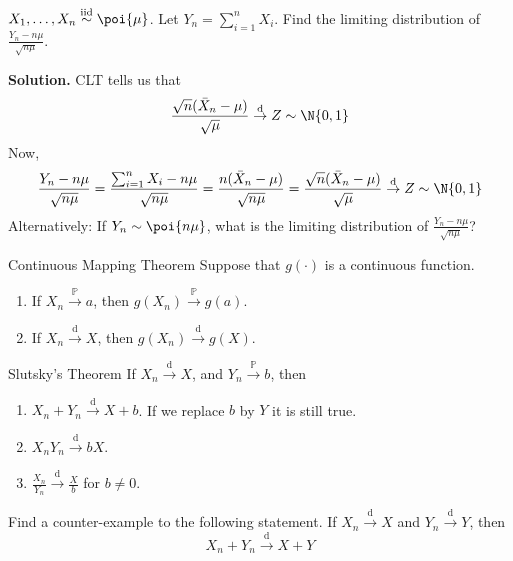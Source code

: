 \begin{Example}{}{}
    $ X_1,\ldots,X_n\stackrel{\text{iid}}{\sim}\poi{\mu} $.
    Let $ Y_n=\sum_{i=1}^{n} X_i $. Find the limiting
    distribution of $ \displaystyle \frac{Y_n-n\mu}{\sqrt{n\mu}} $.

    \textbf{Solution.} CLT tells us that
    \[ \frac{\sqrt{n}(\bar{X}_n-\mu)}{\sqrt{\mu}}\stackrel{\text{d}}{\to}Z\sim \N{0,1} \]
    Now,
    \[ \frac{Y_n-n\mu}{\sqrt{n\mu}}=
        \frac{\sum_{i=1}^{n} X_i-n\mu}{\sqrt{n\mu}}=
        \frac{n(\bar{X}_n-\mu)}{\sqrt{n\mu}}=
        \frac{\sqrt{n}(\bar{X}_n-\mu)}{\sqrt{\mu}}\stackrel{\text{d}}{\to}Z\sim \N{0,1}  \]
    Alternatively: If $ Y_n \sim \poi{n\mu} $, what is the limiting
    distribution of  $ \displaystyle \frac{Y_n-n\mu}{\sqrt{n\mu}} $?
\end{Example}
\begin{Theorem}{Continuous Mapping Theorem}{}
    Suppose that $ g(\cdot) $ is a continuous function.
    \begin{enumerate}[label=(\arabic*)]
        \item If $ X_n\stackrel{\mathbb{P}}{\to}a $, then
              $ g(X_n)\stackrel{\mathbb{P}}{\to}g(a) $.
        \item If $ X_n\stackrel{\text{d}}{\to}X $,
              then $ g(X_n)\stackrel{\text{d}}{\to}g(X) $.
    \end{enumerate}
\end{Theorem}
\begin{Theorem}{Slutsky's Theorem}{}
    If $ X_n\stackrel{\text{d}}{\to} X $, and
    $ Y_n\stackrel{\mathbb{P}}{\to}b $, then
    \begin{enumerate}[label=(\alph*)]
        \item $ X_n+Y_n\stackrel{\text{d}}{\to}X+b $.
              If we replace $ b $ by $ Y $ it is still true.
        \item $ X_n Y_n\stackrel{\text{d}}{\to}bX $.
        \item $ \displaystyle \frac{X_n}{Y_n}\stackrel{\text{d}}{\to}
                  \frac{X}{b} $ for $ b\neq 0 $.
    \end{enumerate}
\end{Theorem}
\begin{Exercise}{}{}
    Find a counter-example to the following statement.
    If $ X_n\stackrel{\text{d}}{\to}X $ and $ Y_n\stackrel{\text{d}}{\to}Y $,
    then
    \[ X_n+Y_n\stackrel{\text{d}}{\to}X+Y \]
\end{Exercise}
